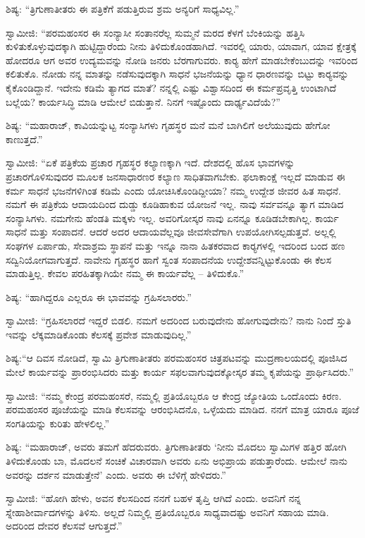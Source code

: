  ಶಿಷ್ಯ: “ತ್ರಿಗುಣಾತೀತರು ಈ ಪತ್ರಿಕೆಗೆ ಪಡುತ್ತಿರುವ ಶ್ರಮ ಅನ್ಯರಿಗೆ ಸಾಧ್ಯವಿಲ್ಲ.” 

 ಸ್ವಾಮೀಜಿ: “ಪರಮಹಂಸರ ಈ ಸಂನ್ಯಾಸೀ ಸಂತಾನರೆಲ್ಲ ಸುಮ್ಮನೆ ಮರದ ಕೆಳಗೆ ಬೆಂಕಿಯನ್ನು ಹತ್ತಿಸಿ ಕುಳಿತುಕೊಳ್ಳುವುದಕ್ಕಾಗಿ ಹುಟ್ಟಿದ್ದಾರೆಂದು ನೀನು ತಿಳಿದುಕೊಂಡಹಾಗಿದೆ. ಇವರಲ್ಲಿ ಯಾರು, ಯಾವಾಗ, ಯಾವ ಕ್ಷೇತ್ರಕ್ಕೆ ಹೋದರೂ ಆಗ ಅವರ ಉದ್ಯಮವನ್ನು ನೋಡಿ ಜನರು ಬೆರಗಾಗುವರು. ಕಾರ‍್ಯ ಹೇಗೆ ಮಾಡಬೇಕೆಂಬುದನ್ನು ಇವರಿಂದ ಕಲಿತುಕೊ. ನೋಡು ನನ್ನ ಮಾತನ್ನು ನಡೆಸುವುದಕ್ಕಾಗಿ ಸಾಧನೆ ಭಜನೆಯನ್ನು ಧ್ಯಾನ ಧಾರಣವನ್ನು ಬಿಟ್ಟು ಕಾರ‍್ಯವನ್ನು ಕೈಕೊಂಡಿದ್ದಾನೆ. ಇದೇನು ಕಡಿಮೆ ತ್ಯಾಗದ ಮಾತೆ? ನನ್ನಲ್ಲಿ ಎಷ್ಟು ವಿಶ್ವಾಸದಿಂದ ಈ ಕರ್ಮಪ್ರವೃತ್ತಿ ಉಂಟಾಗಿದೆ ಬಲ್ಲೆಯ? ಕಾರ್ಯಸಿದ್ಧಿ ಮಾಡಿ ಆಮೇಲೆ ಬಿಡುತ್ತಾನೆ. ನಿನಗೆ ಇಷ್ಟೊಂದು ದಾರ್ಢ್ಯವಿದೆಯೆ?” 

 ಶಿಷ್ಯ: “ಮಹಾರಾಜ್, ಕಾವಿಯನ್ನುಟ್ಟ ಸಂನ್ಯಾಸಿಗಳು ಗೃಹಸ್ಥರ ಮನೆ ಮನೆ ಬಾಗಿಲಿಗೆ ಅಲೆಯುವುದು ಹೇಗೋ ಕಾಣುತ್ತದೆ.” 

 ಸ್ವಾಮೀಜಿ: “ಏಕೆ ಪತ್ರಿಕೆಯ ಪ್ರಚಾರ ಗೃಹಸ್ಥರ ಕಲ್ಯಾಣಕ್ಕಾಗಿ ಇದೆ. ದೇಶದಲ್ಲಿ ಹೊಸ ಭಾವಗಳನ್ನು ಪ್ರಚಾರಗೊಳಿಸುವುದರ ಮೂಲಕ ಜನಸಾಧಾರಣರ ಕಲ್ಯಾಣ ಸಾಧಿತವಾಗಬೇಕು. ಫಲಾಕಾಂಕ್ಷೆ ಇಲ್ಲದೆ ಮಾಡುವ ಈ ಕರ್ಮ ಸಾಧನೆ ಭಜನೆಗಳಿಗಿಂತ ಕಡಿಮೆ ಎಂದು ಯೋಚಿಸಿಕೊಂಡಿದ್ದೀಯಾ? ನಮ್ಮ ಉದ್ದೇಶ ಜೀವರ ಹಿತ ಸಾಧನೆ. ನಮಗೆ ಈ ಪತ್ರಿಕೆಯ ಆದಾಯದಿಂದ ದುಡ್ಡು ಕೂಡಿಹಾಕುವ ಯೋಜನೆ ಇಲ್ಲ. ನಾವು ಸರ್ವವನ್ನೂ ತ್ಯಾಗ ಮಾಡಿದ ಸಂನ್ಯಾಸಿಗಳು. ನಮಗೇನು ಹೆಂಡತಿ ಮಕ್ಕಳು ಇಲ್ಲ. ಅವರಿಗೋಸ್ಕರ ನಾವು ಏನನ್ನೂ ಕೂಡಿಡಬೇಕಾಗಿಲ್ಲ. ಕಾರ್ಯ ಸಾಧನೆ ಮತ್ತು ಸಂಪಾದನೆ. ಆದರೆ ಅದರ ಆದಾಯವೆಲ್ಲವೂ ಜೀವಸೇವೆಗಾಗಿ ಉಪಯೋಗಿಸಲ್ಪಡುತ್ತವೆ. ಅಲ್ಲಲ್ಲಿ ಸಂಘಗಳ ಏರ್ಪಾಡು, ಸೇವಾಶ್ರಮ ಸ್ಥಾಪನೆ ಮತ್ತು ಇನ್ನೂ ನಾನಾ ಹಿತಕರವಾದ ಕಾರ‍್ಯಗಳಲ್ಲಿ ಇದರಿಂದ ಬಂದ ಹಣ ಸದ್ವಿನಿಯೋಗವಾಗುತ್ತದೆ. ನಾವೇನು ಗೃಹಸ್ಥರ ಹಾಗೆ ಸ್ವಂತ ಸಂಪಾದನೆಯ ಉದ್ದೇಶವನ್ನಿಟ್ಟುಕೊಂಡು ಈ ಕೆಲಸ ಮಾಡುತ್ತಿಲ್ಲ. ಕೇವಲ ಪರಹಿತಕ್ಕಾಗಿಯೇ ನಮ್ಮ ಈ ಕಾರ್ಯವೆಲ್ಲ – ತಿಳಿದುಕೊ.” 

 ಶಿಷ್ಯ: “ಹಾಗಿದ್ದರೂ ಎಲ್ಲರೂ ಈ ಭಾವವನ್ನು ಗ್ರಹಿಸಲಾರರು.” 

 ಸ್ವಾಮೀಜಿ: “ಗ್ರಹಿಸಲಾರದೆ ಇದ್ದರೆ ಬಿಡಲಿ. ನಮಗೆ ಅದರಿಂದ ಬರುವುದೇನು ಹೋಗುವುದೇನು? ನಾನು ನಿಂದೆ ಸ್ತುತಿ ಇವನ್ನು ಲೆಕ್ಕಮಾಡಿಕೊಂಡು ಕೆಲಸಕ್ಕೆ ಪ್ರವೇಶ ಮಾಡುವುದಿಲ್ಲ.” 

 ಶಿಷ್ಯ:‌“ಆ ದಿವಸ ನೋಡಿದೆ, ಸ್ವಾಮಿ ತ್ರಿಗುಣಾತೀತರು ಪರಮಹಂಸರ ಚಿತ್ರಪಟವನ್ನು ಮುದ್ರಣಾಲಯದಲ್ಲಿ ಪೂಜಿಸಿದ ಮೇಲೆ ಕಾರ್ಯವನ್ನು ಪ್ರಾರಂಭಿಸಿದರು ಮತ್ತು ಕಾರ್ಯ ಸಫಲವಾಗುವುದಕ್ಕೋಸ್ಕರ ತಮ್ಮ ಕೃಪೆಯನ್ನು ಪ್ರಾರ್ಥಿಸಿದರು.” 

 ಸ್ವಾಮೀಜಿ: “ನಮ್ಮ ಕೇಂದ್ರ ಪರಮಹಂಸರೆ, ನಮ್ಮಲ್ಲಿ ಪ್ರತಿಯೊಬ್ಬರೂ ಆ ಕೇಂದ್ರ ಜ್ಯೋತಿಯ ಒಂದೊಂದು ಕಿರಣ. ಪರಮಹಂಸರ ಪೂಜೆಯನ್ನು ಮಾಡಿ ಕೆಲಸವನ್ನು ಆರಂಭಿಸಿದನೊ, ಒಳ್ಳೆಯದು ಮಾಡಿದ. ನನಗೆ ಮಾತ್ರ ಯಾರೂ ಪೂಜೆ ಸಂಗತಿಯನ್ನು ಕುರಿತು ಹೇಳಲಿಲ್ಲ.” 

 ಶಿಷ್ಯ: “ಮಹಾರಾಜ್, ಅವರು ತಮಗೆ ಹೆದರುವರು. ತ್ರಿಗುಣಾತೀತರು ‘ನೀನು ಮೊದಲು ಸ್ವಾಮಿಗಳ ಹತ್ತಿರ ಹೋಗಿ ತಿಳಿದುಕೊಂಡು ಬಾ, ಮೊದಲನೆ ಸಂಚಿಕೆ ವಿಚಾರವಾಗಿ ಅವರು ಏನು ಅಭಿಪ್ರಾಯ ಪಡುತ್ತಾರೆಂದು. ಆಮೇಲೆ ನಾನು ಅವರನ್ನು ದರ್ಶನ ಮಾಡುತ್ತೇನೆ’ ಎಂದು. ಅವರು ಈ ಬೆಳಿಗ್ಗೆ ಹೇಳಿದರು.” 

 ಸ್ವಾಮೀಜಿ: “ಹೋಗಿ ಹೇಳು, ಅವನ ಕೆಲಸದಿಂದ ನನಗೆ ಬಹಳ ತೃಪ್ತಿ ಆಗಿದೆ ಎಂದು. ಅವನಿಗೆ ನನ್ನ ಸ್ನೇಹಾಶೀರ್ವಾದಗಳನ್ನು ತಿಳಿಸು. ಅಲ್ಲದೆ ನಿಮ್ಮಲ್ಲಿ ಪ್ರತಿಯೊಬ್ಬರೂ ಸಾಧ್ಯವಾದಷ್ಟು ಅವನಿಗೆ ಸಹಾಯ ಮಾಡಿ. ಅದರಿಂದ ದೇವರ ಕೆಲಸವೆ ಆಗುತ್ತದೆ.” 

